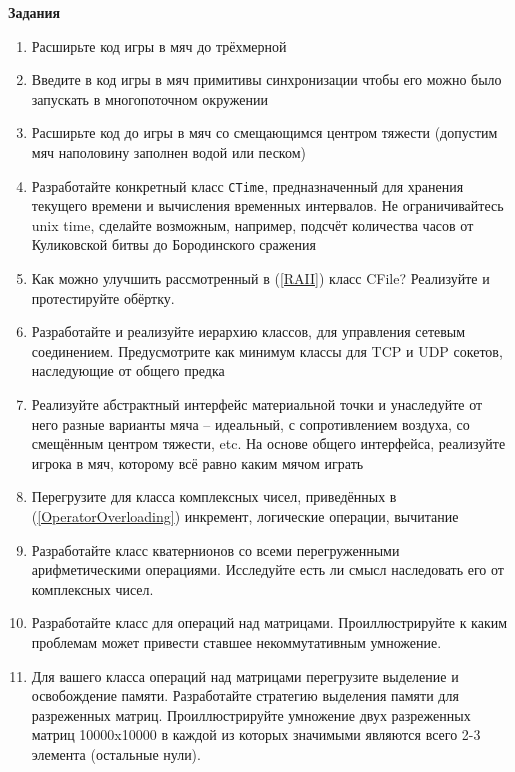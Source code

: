 \documentclass[a4paper,12pt,oneside]{article}
\begin{document}
\textbf{Задания}

\begin{enumerate}
\item
Расширьте код игры в мяч до трёхмерной 

\item
Введите в код игры в мяч примитивы синхронизации чтобы его можно было запускать в многопоточном окружении

\item
Расширьте код до игры в мяч со смещающимся центром тяжести (допустим мяч наполовину заполнен водой или песком)

\item
Разработайте конкретный класс \lstinline!CTime!, предназначенный для хранения текущего времени и вычисления временных интервалов. Не ограничивайтесь unix time, сделайте возможным, например, подсчёт количества часов от Куликовской битвы до Бородинского сражения

\item
Как можно улучшить рассмотренный в (\ref{RAII}) класс CFile? Реализуйте и протестируйте обёртку.

\item
Разработайте и реализуйте иерархию классов, для управления сетевым соединением. Предусмотрите как минимум классы для TCP и UDP сокетов, наследующие от общего предка

\item
Реализуйте абстрактный интерфейс материальной точки и унаследуйте от него разные варианты мяча -- идеальный, с сопротивлением воздуха, со смещённым центром тяжести, etc. На основе общего интерфейса, реализуйте игрока в мяч, которому всё равно каким мячом играть

\item
Перегрузите для класса комплексных чисел, приведённых в (\ref{OperatorOverloading}) инкремент, логические операции, вычитание

\item
Разработайте класс кватернионов со всеми перегруженными арифметическими операциями. Исследуйте есть ли смысл наследовать его от комплексных чисел.

\item
Разработайте класс для операций над матрицами. Проиллюстрируйте к каким проблемам может привести ставшее некоммутативным умножение.

\item
Для вашего класса операций над матрицами перегрузите выделение и освобождение памяти. Разработайте стратегию выделения памяти для разреженных матриц. Проиллюстрируйте умножение двух разреженных матриц 10000x10000 в каждой из которых значимыми являются всего 2-3 элемента (остальные нули).

\end{enumerate}
\end{document}
